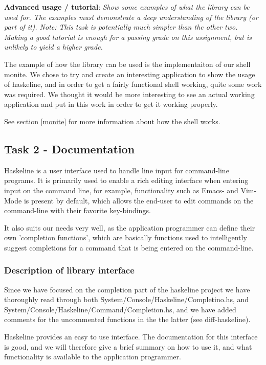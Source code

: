 \documentclass[11pt,a4paper]{article}
\begin{document}
\textbf{Advanced usage / tutorial}: \textit{Show some examples of what the library can be used
for. The examples must demonstrate a deep understanding of the library (or part
of it). Note: This task is potentially much simpler than the other two. Making a
good tutorial is enough for a passing grade on this assignment, but is unlikely
to yield a higher grade.}

The example of how the library can be used is the implementaiton of our shell
monite. We chose to try and create an interesting application to show the usage
of haskeline, and in order to get a fairly functional shell working, quite some
work was required. We thought it would be more interesting to see an actual
working application and put in this work in order to get it working properly.

See section \ref{monite} for more information about how the shell works.

\subsection{Task 2 - Documentation}
Haskeline is a user interface used to handle line input for command-line
programs. It is primarily used to enable a rich editing interface when entering
input on the command line, for example, functionality such as Emacs- and
Vim-Mode is present by default, which allows the end-user to edit commands on
the command-line with their favorite key-bindings.

It also suits our needs very well, as the application programmer can define
their own 'completion functions', which are basically functions used to
intelligently suggest completions for a command that is being entered on the
command-line.

\subsubsection{Description of library interface}
Since we have focused on the completion part of the haskeline project we have
thoroughly read through both System/Console/Haskeline/Completino.hs, and
System/Console/Haskeline/Command/Completion.hs, and we have added comments for
the uncommented functions in the the latter (see diff-haskeline).

Haskeline provides an easy to use interface. The documentation for this
interface is good, and we will therefore give a brief summary on how to use it,
and what functionality is available to the application programmer.
\end{document}
